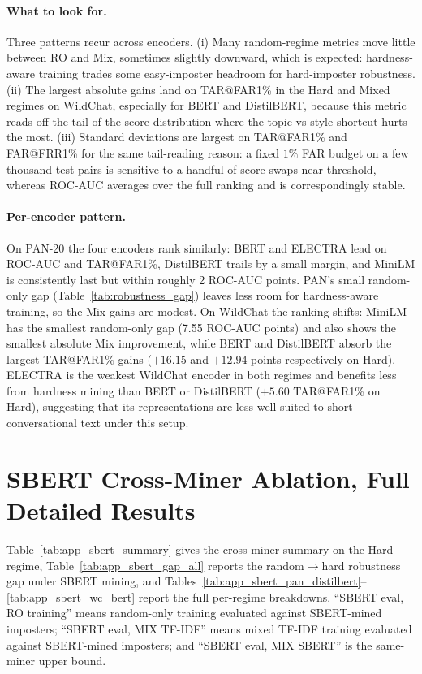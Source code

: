 \documentclass[11pt]{article}
\begin{document}
\paragraph{What to look for.} Three patterns recur across encoders. (i) Many random-regime metrics move little between RO and Mix, sometimes slightly downward, which is expected: hardness-aware training trades some easy-imposter headroom for hard-imposter robustness. (ii) The largest absolute gains land on TAR@FAR1\% in the Hard and Mixed regimes on WildChat, especially for BERT and DistilBERT, because this metric reads off the tail of the score distribution where the topic-vs-style shortcut hurts the most. (iii) Standard deviations are largest on TAR@FAR1\% and FAR@FRR1\% for the same tail-reading reason: a fixed $1\%$ FAR budget on a few thousand test pairs is sensitive to a handful of score swaps near threshold, whereas ROC-AUC averages over the full ranking and is correspondingly stable.

\paragraph{Per-encoder pattern.} On PAN-20 the four encoders rank similarly: BERT and ELECTRA lead on ROC-AUC and TAR@FAR1\%, DistilBERT trails by a small margin, and MiniLM is consistently last but within roughly 2 ROC-AUC points. PAN's small random-only gap (Table~\ref{tab:robustness_gap}) leaves less room for hardness-aware training, so the Mix gains are modest. On WildChat the ranking shifts: MiniLM has the smallest random-only gap (7.55 ROC-AUC points) and also shows the smallest absolute Mix improvement, while BERT and DistilBERT absorb the largest TAR@FAR1\% gains ($+16.15$ and $+12.94$ points respectively on Hard). ELECTRA is the weakest WildChat encoder in both regimes and benefits less from hardness mining than BERT or DistilBERT ($+5.60$ TAR@FAR1\% on Hard), suggesting that its representations are less well suited to short conversational text under this setup.

\section{SBERT Cross-Miner Ablation, Full Detailed Results}
\label{sec:appendix_sbert}


Table~\ref{tab:app_sbert_summary} gives the cross-miner summary on the Hard regime, Table~\ref{tab:app_sbert_gap_all} reports the random$\to$hard robustness gap under SBERT mining, and Tables~\ref{tab:app_sbert_pan_distilbert}--\ref{tab:app_sbert_wc_bert} report the full per-regime breakdowns. ``SBERT eval, RO training'' means random-only training evaluated against SBERT-mined imposters; ``SBERT eval, MIX TF-IDF'' means mixed TF-IDF training evaluated against SBERT-mined imposters; and ``SBERT eval, MIX SBERT'' is the same-miner upper bound.
\end{document}
